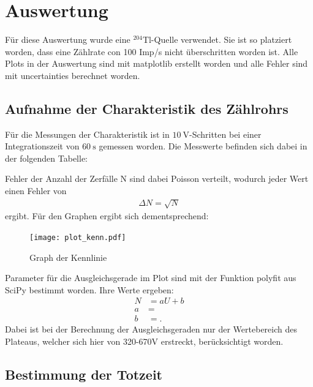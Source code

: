 
\section{Auswertung}

Für diese Auswertung wurde eine $^{204}$Tl-Quelle verwendet. Sie ist so 
platziert worden, dass eine Zählrate con 100 Imp/s nicht überschritten worden ist.
Alle Plots in der Auswertung sind mit matplotlib \cite{matplotlib} erstellt worden und alle Fehler sind mit
uncertainties \cite{uncertainties} berechnet worden.

\subsection{Aufnahme der Charakteristik des Zählrohrs}
Für die Messungen der Charakteristik ist in $\SI{10}{\volt} $-Schritten bei einer 
Integrationszeit von $\SI{60}{\second} $ gemessen worden.
Die Messwerte befinden sich dabei in der folgenden Tabelle:

\justifying Fehler der Anzahl der Zerfälle N sind dabei Poisson verteilt, wodurch jeder Wert 
einen Fehler von
\begin{align}
    \Delta N = \sqrt{N} \label{eq:1}
\end{align}
ergibt.
Für den Graphen ergibt sich dementsprechend:
\begin{figure}[H]
    \centering
    \texttt{[image: plot\_kenn.pdf]}
    \caption{Graph der Kennlinie \cite{matplotlib}}
    \label{fig:7}
\end{figure}

\justifying Parameter für die Ausgleichsgerade im Plot sind mit der Funktion polyfit aus SciPy \cite{scipy}
bestimmt worden. Ihre Werte ergeben:
\begin{align}
    N &= aU+b\label{eq:2} \\
    a&= \text{} \label{eq:3} \\
    b&= \text{} \label{eq:4}.
\end{align}
Dabei ist bei der Berechnung der Ausgleichsgeraden nur der Wertebereich des
Plateaus, welcher sich hier von 320-670V erstreckt, berücksichtigt worden.

\subsection{Bestimmung der Totzeit}

